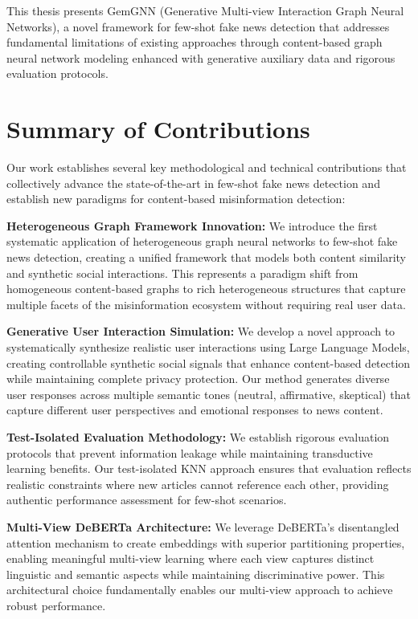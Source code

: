 
This thesis presents GemGNN (Generative Multi-view Interaction Graph Neural Networks), a novel framework for few-shot fake news detection that addresses fundamental limitations of existing approaches through content-based graph neural network modeling enhanced with generative auxiliary data and rigorous evaluation protocols.

\section{Summary of Contributions}

Our work establishes several key methodological and technical contributions that collectively advance the state-of-the-art in few-shot fake news detection and establish new paradigms for content-based misinformation detection:

\textbf{Heterogeneous Graph Framework Innovation:} We introduce the first systematic application of heterogeneous graph neural networks to few-shot fake news detection, creating a unified framework that models both content similarity and synthetic social interactions. This represents a paradigm shift from homogeneous content-based graphs to rich heterogeneous structures that capture multiple facets of the misinformation ecosystem without requiring real user data.

\textbf{Generative User Interaction Simulation:} We develop a novel approach to systematically synthesize realistic user interactions using Large Language Models, creating controllable synthetic social signals that enhance content-based detection while maintaining complete privacy protection. Our method generates diverse user responses across multiple semantic tones (neutral, affirmative, skeptical) that capture different user perspectives and emotional responses to news content.

\textbf{Test-Isolated Evaluation Methodology:} We establish rigorous evaluation protocols that prevent information leakage while maintaining transductive learning benefits. Our test-isolated KNN approach ensures that evaluation reflects realistic constraints where new articles cannot reference each other, providing authentic performance assessment for few-shot scenarios.

\textbf{Multi-View DeBERTa Architecture:} We leverage DeBERTa's disentangled attention mechanism to create embeddings with superior partitioning properties, enabling meaningful multi-view learning where each view captures distinct linguistic and semantic aspects while maintaining discriminative power. This architectural choice fundamentally enables our multi-view approach to achieve robust performance.

